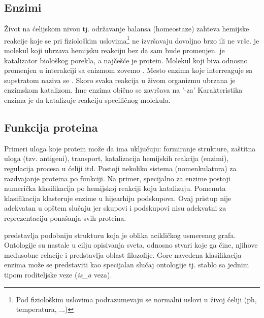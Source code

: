 
\subsection{Enzimi}

Život na ćelijskom nivou tj. održavanje balansa (homeostaze) zahteva hemijske
reakcije koje se pri fiziološkim uslovima\footnote{Pod fiziološkim uslovima
podrazumevaju se normalni uslovi u živoj ćeliji (ph, temperatura, ...)} ne
izvršavaju dovoljno brzo ili ne vrše.
 je molekul koji ubrzava hemijsku reakciju bez da sam bude
promenjen.  je katalizator biološkog porekla, a najčešće je protein.
Molekul koji biva  odnosno promenjen u interakciji sa
enizmom zovemo . Mesto enzima koje interreaguje sa
supstratom naziva se .  Skoro svaka reakcija u živom
organizmu ubrzana je enzimskom katalizom. Ime enzima obično se završava na '-za'
Karakteristika enzima je da katalizuje reakciju specifičnog molekula.

\subsection{Funkcija proteina}

Primeri uloga koje protein može da ima uključuju: formiranje
strukture, zaštitna uloga (tzv. antigeni), transport, katalizacija hemijskih
reakcija (enzimi), regulacija procesa u ćeliji itd.  Postoji nekoliko sistema
(nomenkulatura) za razdvajanje proteina po funkciji.  Na primer, specijalno za
enzime postoji numerička klasifikacija po hemijskoj reakciji koju katalizuju.
Pomenuta klasifikacija klasteruje enzime u hijearhiju podskupova. Ovaj pristup
nije adekvatan u opštem slučaju jer skupovi i podskupovi nisu adekvatni za
reprezentaciju ponašanja svih proteina.

 predstavlja podobniju strukturu koja je oblika acikličkog
usmerenog grafa.  Ontologije su nastale u cilju opisivanja sveta, odnosno
stvari koje ga čine, njihove međusobne relacije i predstavlja oblast
filozofije.  Gore navedena klasifikacija enzima može se predstaviti kao
specijalan slučaj ontologije tj. stablo sa jednim tipom roditeljske veze
(\textit{is\_a} veza).

